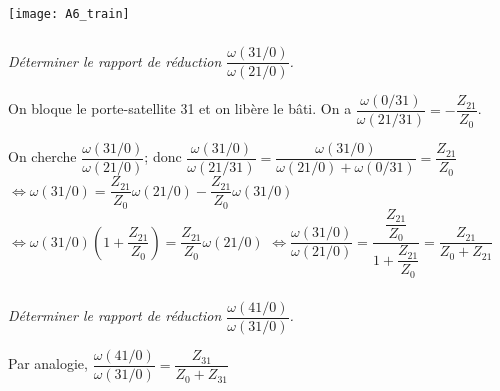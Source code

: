 \begin{multicols}{2}
\fi


\begin{center}
\texttt{[image: A6\_train]}
\end{center}

\subparagraph{}
\textit{Déterminer le rapport de réduction $\dfrac{\omega(31/0)}{\omega(21/0)}$.}
\ifprof
\begin{corrige}
On bloque le porte-satellite 31 et on libère le bâti. On a $\dfrac{\omega(0/31)}{\omega(21/31)}=-\dfrac{Z_{21}}{Z_0}$.

On cherche 
$\dfrac{\omega(31/0)}{\omega(21/0)}$; donc $\dfrac{\omega(31/0)}{\omega(21/31)}=\dfrac{\omega(31/0)}{\omega(21/0)+\omega(0/31)}=\dfrac{Z_{21}}{Z_0}$
$\Leftrightarrow \omega(31/0)=\dfrac{Z_{21}}{Z_0}\omega(21/0)-\dfrac{Z_{21}}{Z_0}\omega(31/0)$
$\Leftrightarrow \omega(31/0)\left(1+\dfrac{Z_{21}}{Z_0}\right)=\dfrac{Z_{21}}{Z_0}\omega(21/0)$
$\Leftrightarrow \dfrac{\omega(31/0)}{\omega(21/0)}=\dfrac{\dfrac{Z_{21}}{Z_0}}{1+\dfrac{Z_{21}}{Z_0}}=\dfrac{Z_{21}}{Z_{0}+Z_{21}}$
\end{corrige}
\else
\fi

\subparagraph{}
\textit{Déterminer le rapport de réduction $\dfrac{\omega(41/0)}{\omega(31/0)}$.}
\ifprof
\begin{corrige}
Par analogie, 
$\dfrac{\omega(41/0)}{\omega(31/0)}=\dfrac{Z_{31}}{Z_{0}+Z_{31}}$
\end{corrige}
\else
\fi



\end{multicols}
